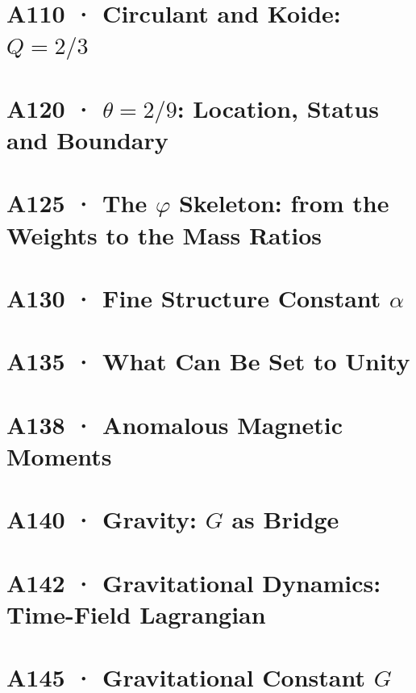 \documentclass[11pt,twoside,openright]{book}
\begin{document}
\chapter[A110 · Circulant and Koide]{A110 · Circulant and Koide: $Q=2/3$}


\chapter[A120 · $\theta = 2/9$]{A120 · $\theta=2/9$: Location, Status and Boundary}


\chapter[A125 · $\varphi$ skeleton]{A125 · The $\varphi$ Skeleton: from the Weights to the Mass Ratios}


\chapter[A130 · Fine Structure Constant]{A130 · Fine Structure Constant $\alpha$}


\chapter[A135 · What Can Be Set to Unity]{A135 · What Can Be Set to Unity}


\chapter[A138 · Anomalous Magnetic Moments]{A138 · Anomalous Magnetic Moments}


\chapter[A140 · Gravity: $G$ as Bridge]{A140 · Gravity: $G$ as Bridge}


\chapter[A142 · Gravitational Dynamics]{A142 · Gravitational Dynamics: Time-Field Lagrangian}


\chapter[A145 · Gravitational Constant]{A145 · Gravitational Constant $G$}

\end{document}

